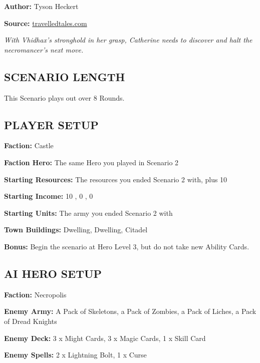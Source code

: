 
\begin{multicols*}{2}

\textbf{Author:} Tyson Heckert

\textbf{Source:} \href{https://travelledtales.com}{travelledtales.com}

\textit{With Vhidhax's stronghold in her grasp, Catherine needs to discover and halt the necromancer's next move.}

\subsection*{\MakeUppercase{Scenario length}}

This Scenario plays out over 8 Rounds.

\subsection*{\MakeUppercase{Player setup}}

\textbf{Faction:} Castle

\textbf{Faction Hero:} The same Hero you played in Scenario 2

\textbf{Starting Resources:} The resources you ended Scenario 2 with, plus 10 

\textbf{Starting Income:} 10 , 0 , 0 

\textbf{Starting Units:} The army you ended Scenario 2 with

\textbf{Town Buildings:}  Dwelling,  Dwelling, Citadel

\textbf{Bonus:} Begin the scenario at Hero Level 3, but do not take new Ability Cards.

\subsection*{\MakeUppercase{AI Hero setup}}

\textbf{Faction:} Necropolis

\textbf{Enemy Army:} A Pack of Skeletons, a Pack of Zombies, a Pack of Liches, a Pack of Dread Knights

\textbf{Enemy Deck:} 3 x Might Cards, 3 x Magic Cards, 1 x Skill Card

\textbf{Enemy Spells:} 2 x Lightning Bolt, 1 x Curse


\end{multicols*}
